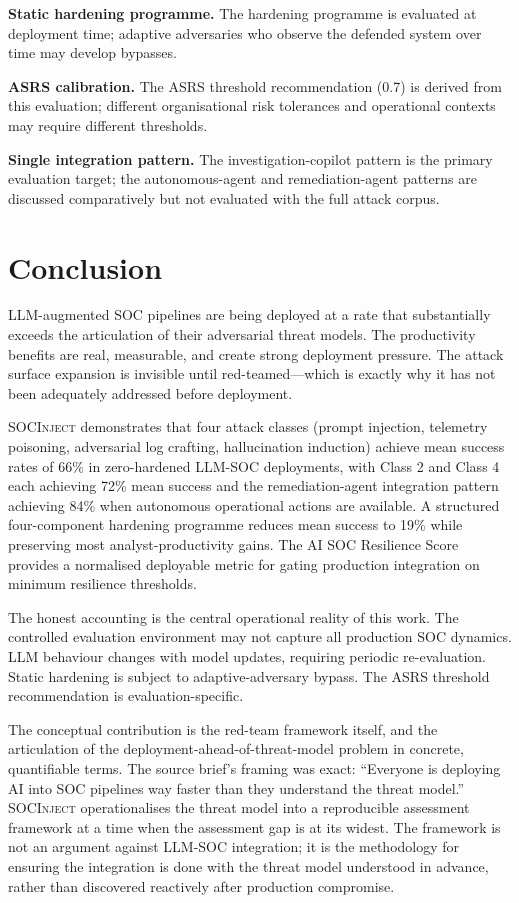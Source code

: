 \documentclass[sigconf,nonacm]{acmart}
\begin{document}
\textbf{Static hardening programme.} The hardening programme
is evaluated at deployment time; adaptive adversaries who
observe the defended system over time may develop bypasses.

\textbf{ASRS calibration.} The ASRS threshold recommendation
(0.7) is derived from this evaluation; different organisational
risk tolerances and operational contexts may require different
thresholds.

\textbf{Single integration pattern.} The investigation-copilot
pattern is the primary evaluation target; the autonomous-agent
and remediation-agent patterns are discussed comparatively but
not evaluated with the full attack corpus.

\section{Conclusion}

LLM-augmented SOC pipelines are being deployed at a rate that
substantially exceeds the articulation of their adversarial
threat models. The productivity benefits are real, measurable,
and create strong deployment pressure. The attack surface
expansion is invisible until red-teamed---which is exactly why
it has not been adequately addressed before deployment.

\textsc{SOCInject} demonstrates that four attack classes (prompt
injection, telemetry poisoning, adversarial log crafting,
hallucination induction) achieve mean success rates of 66\% in
zero-hardened LLM-SOC deployments, with Class 2 and Class 4
each achieving 72\% mean success and the remediation-agent
integration pattern achieving 84\% when autonomous operational
actions are available. A structured four-component hardening
programme reduces mean success to 19\% while preserving most
analyst-productivity gains. The AI SOC Resilience Score provides
a normalised deployable metric for gating production integration
on minimum resilience thresholds.

The honest accounting is the central operational reality of this
work. The controlled evaluation environment may not capture all
production SOC dynamics. LLM behaviour changes with model
updates, requiring periodic re-evaluation. Static hardening
is subject to adaptive-adversary bypass. The ASRS threshold
recommendation is evaluation-specific.

The conceptual contribution is the red-team framework itself,
and the articulation of the deployment-ahead-of-threat-model
problem in concrete, quantifiable terms. The source brief's
framing was exact: ``Everyone is deploying AI into SOC pipelines
way faster than they understand the threat model.''
\textsc{SOCInject} operationalises the threat model into a
reproducible assessment framework at a time when the assessment
gap is at its widest. The framework is not an argument against
LLM-SOC integration; it is the methodology for ensuring the
integration is done with the threat model understood in advance,
rather than discovered reactively after production compromise.
\end{document}
